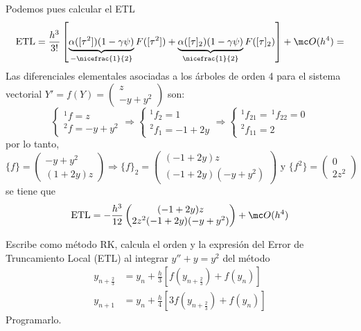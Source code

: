 \begin{sol}
\begin{enumerate}
Podemos pues calcular el ETL
$$\text{ETL} = \frac{h^3}{3!} \left[ \underbrace{\alpha([\tau^2]) (1-\gamma \psi)}_{-\nicefrac{1}{2}}F([\tau^2]) +  \underbrace{\alpha([\tau]_2) (1-\gamma \psi)}_{\nicefrac{1}{2}} F([\tau]_2)  \right] + \mc O(h^4) = $$
Las diferenciales elementales asociadas a los árboles de orden 4 para el sistema vectorial $Y' = f(Y) = \begin{pmatrix} z \\ -y + y^2 \end{pmatrix}$ son:
$$\begin{cases}
    ^1\!f = z \\ ^2\!f =-y + y^2
\end{cases} \Rightarrow \begin{cases}
    ^1\!f_2 = 1 \\ ^2\!f_1 =-1 + 2y
\end{cases} \Rightarrow \begin{cases}
    ^1\!f_{21} = \, ^1\!f_{22} = 0 \\ ^2\!f_{11} =2
\end{cases}$$
por lo tanto,
$$\{f\} = \begin{pmatrix}
    -y+y^2 \\ (1+2y)z
\end{pmatrix} \Rightarrow \{f\}_2 = \begin{pmatrix}
    (-1+2y)z \\ (-1+2y)(-y+y^2)
\end{pmatrix} \text{ y } \{f^2\} = \begin{pmatrix}
    0 \\ 2z^2
\end{pmatrix}$$
se tiene que 
$$\text{ETL} = -\frac{h^3}{12} \begin{pmatrix} (-1+2y)z \\ 2z^2(-1+2y)(-y+y^2)
\end{pmatrix} + \mc O(h^4)$$
\end{enumerate}
\end{sol}
\begin{ejer}
    [5.7.4] Escribe como m\'etodo RK, calcula el orden y la expresión del Error de Truncamiento Local (ETL) al integrar $y'' + y = y^2$ del m\'etodo
    \begin{align*}
y_{n+\frac{2}{3}} &= y_n + \frac{h}{3} \left[ f\left(y_{n+\frac{2}{3}}\right) + f(y_n) \right] \\
y_{n+1} &= y_n + \frac{h}{4} \left[ 3f\left(y_{n+\frac{2}{3}}\right) + f(y_n) \right]
\end{align*}
    Programarlo.
    \end{ejer}
